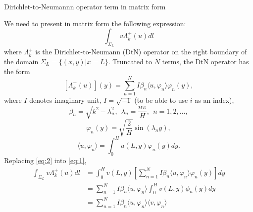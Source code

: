 \documentclass[11pt]{article}
\begin{document}
\begin{center}
{\Large Dirichlet-to-Neumannn operator term in matrix form}
\end{center}
We need to present in matrix form the following expression:
\begin{equation}
  \label{eq:1}
  \int_{\Sigma_L}v \Lambda_k^+(u) dl
\end{equation}
where $\Lambda_k^+$ is the Dirichlet-to-Neumann (DtN) operator on the right boundary of the domain $\Sigma_L = \{(x,y)|x=L\}$. Truncated to $N$ terms, the DtN operator has the form
\begin{equation}
  \label{eq:2}
  [\Lambda_k^+(u)](y) = \sum_{n=1}^N I \beta_n \langle u, \varphi_n \rangle \varphi_n(y),
\end{equation}
where $I$ denotes imaginary unit, $I = \sqrt{-1}$ (to be able to use $i$ as an index),
\begin{equation}
  \label{eq:3}
  \beta_n = \sqrt{k^2 - \lambda_n^2},~~\lambda_n = \frac{n\pi}{H},~~n=1,2,\ldots,
\end{equation}
\begin{equation}
  \label{eq:4}
  \varphi_n(y) = \sqrt{\frac{2}{H}} \sin(\lambda_n y),
\end{equation}
\begin{equation}
  \label{eq:5}
  \langle u, \varphi_n \rangle = \int_0^H u(L,y) \varphi_n(y) dy.
\end{equation}
Replacing \eqref{eq:2} into \eqref{eq:1},
\begin{align}
  \label{eq:27}
  \int_{\Sigma_L}v \Lambda_k^+(u) dl &= \int_0^H v(L,y) \left[\sum_{n=1}^N I \beta_n \langle u, \varphi_n \rangle \varphi_n(y)\right] dy \\
                                     &= \sum_{n=1}^N I \beta_n \langle u, \varphi_n \rangle \int_0^H v(L,y) \phi_n(y) dy \\
                                     &= \sum_{n=1}^N I \beta_n \langle u, \varphi_n \rangle \langle v, \varphi_n \rangle \label{eq:27b}
\end{align}
\end{document}

